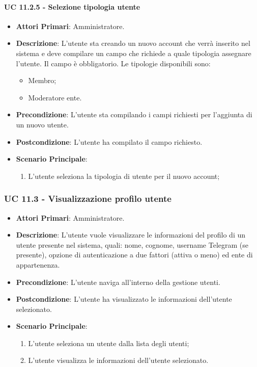 			\paragraph{UC 11.2.5 - Selezione tipologia utente}
			\begin{itemize}
				\item \textbf{Attori Primari}: Amministratore.
				\item \textbf{Descrizione}: L'utente sta creando un nuovo account che verrà inserito nel sistema e deve compilare un campo che richiede a quale tipologia assegnare l'utente. Il campo è obbligatorio. Le tipologie disponibili sono:
				\begin{itemize}
					\item Membro;
					\item Moderatore ente.
				\end{itemize}
				\item \textbf{Precondizione}: L'utente sta compilando i campi richiesti per l'aggiunta di un nuovo utente.
				\item \textbf{Postcondizione}: L'utente ha compilato il campo richiesto.
				\item \textbf{Scenario Principale}:
				\begin{enumerate}
					\item{L'utente seleziona la tipologia di utente per il nuovo account;}
				\end{enumerate}	
			\end{itemize}

			\subsubsection{UC 11.3 - Visualizzazione profilo utente}
			\begin{itemize}
				\item \textbf{Attori Primari}: Amministratore.
				\item \textbf{Descrizione}: L'utente vuole visualizzare le informazioni del profilo di un utente presente nel sistema, quali: nome, cognome, username Telegram (se presente), opzione di autenticazione a due fattori (attiva o meno) ed ente di appartenenza.
				\item \textbf{Precondizione}: L'utente naviga all'interno della gestione utenti.
				\item \textbf{Postcondizione}: L'utente ha visualizzato le informazioni dell'utente selezionato.
				\item \textbf{Scenario Principale}:
				\begin{enumerate}
					\item{L'utente seleziona un utente dalla lista degli utenti;}
					\item{L'utente visualizza le informazioni dell'utente selezionato.}
				\end{enumerate}
			\end{itemize}


